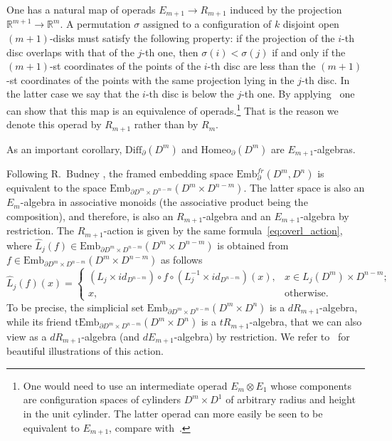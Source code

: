 \documentclass[11pt]{amsart}
\theoremstyle{definition}
\newcommand{\R}{{\mathbb R}}
\newcommand{\Embfrmn}{\mathrm{Emb}_\partial^{fr}(D^m,D^n)}
\newcommand{\Emb}{\mathrm{Emb}}
\newcommand{\tEmb}{\mathrm{tEmb}}
\newcommand{\Diff}{\mathrm{Diff}}
\newcommand{\Homeo}{\mathrm{Homeo}}
\numberwithin{equation}{section}
\begin{document}
One has a natural map of operads $E_{m+1}\to R_{m+1}$  induced by the projection $\R^{m+1}\to\R^m$. A permutation $\sigma$ assigned to
a configuration of $k$ disjoint open $(m+1)$-disks must satisfy the following property: if the projection of the $i$-th disc overlaps with that of the $j$-th one, then 
$\sigma(i)<\sigma(j)$ if and only if the $(m+1)$-st coordinates of the points of the $i$-th disc are less than the $(m+1)$-st coordinates of the points
with the same projection lying in the $j$-th disc. In the latter case we say that the $i$-th disc is below the $j$-th one. By applying~\cite[Main Theorem]{Smale_vietoris} one can  show that this map
is an equivalence of operads.\footnote{One would need to use an intermediate operad $E_m\otimes E_1$  whose components are configuration spaces of cylinders $D^m\times D^1$ of arbitrary radius and height in the unit cylinder. The latter operad can more easily be seen to be equivalent to $E_{m+1}$, compare with~\cite{Dunn}.} That is the reason we denote this operad by $R_{m+1}$ rather than by $R_m$. %

As an important corollary, $\Diff_\partial(D^m)$ and $\Homeo_\partial(D^m)$ are $E_{m+1}$-algebras. 


Following R.~Budney \cite{Budney_cubes}, the framed embedding space $\Embfrmn$ is equivalent to the space $\Emb_{\partial D^m\times D^{n-m}}(D^m\times D^{n-m})$. %
The latter space is also an $E_m$-algebra in associative monoids (the associative product being the composition), and therefore, is also an $R_{m+1}$-algebra
and an $E_{m+1}$-algebra by restriction. The $R_{m+1}$-action is given by the same formula~\eqref{eq:overl_action}, where 
$\hat L_j(f)\in \Emb_{\partial D^m\times D^{n-m}}(D^m\times D^{n-m})$ is obtained from $f\in \Emb_{\partial D^m\times D^{n-m}}(D^m\times D^{n-m})$ as follows
\[
\hat L_j(f)(x)=
\begin{cases}
(L_j\times id_{D^{n-m}})\circ f\circ (L_j^{-1}\times id_{D^{n-m}})(x),& x\in L_j(D^m)\times D^{n-m};\\
x,& \text{otherwise.}
\end{cases}
\]
To be  precise, the simplicial set $\Emb_{\partial D^m\times D^{n-m}}(D^m\times D^n)$ is a $dR_{m+1}$-algebra, while its friend
$\tEmb_{\partial D^m\times D^{n-m}}(D^m\times D^n)$ is a $tR_{m+1}$-algebra, that we can also view as  a $dR_{m+1}$-algebra (and $dE_{m+1}$-algebra)
by restriction. We refer to~\cite{Budney_cubes} for beautiful illustrations of this action.
\end{document}
